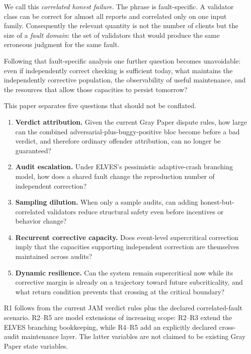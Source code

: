 We call this \emph{correlated honest failure}. The phrase is fault-specific. A validator class can be correct for almost all reports and correlated only on one input family. Consequently the relevant quantity is not the number of clients but the size of a \emph{fault domain}: the set of validators that would produce the same erroneous judgment for the same fault.

Following that fault-specific analysis one further question becomes unavoidable: even if independently correct checking is sufficient today, what maintains the independently corrective population, the observability of useful maintenance, and the resources that allow those capacities to persist tomorrow?

This paper separates five questions that should not be conflated.

\begin{enumerate}[label=\textbf{R\arabic*.},leftmargin=*]
\item \textbf{Verdict attribution.} Given the current Gray Paper dispute rules, how large can the combined adversarial-plus-buggy-positive bloc become before a bad verdict, and therefore ordinary offender attribution, can no longer be guaranteed?
\item \textbf{Audit escalation.} Under ELVES's pessimistic adaptive-crash branching model, how does a shared fault change the reproduction number of independent correction?
\item \textbf{Sampling dilution.} When only a sample audits, can adding honest-but-correlated validators reduce structural safety even before incentives or behavior change?
\item \textbf{Recurrent corrective capacity.} Does event-level supercritical correction imply that the capacities supporting independent correction are themselves maintained across audits?
\item \textbf{Dynamic resilience.} Can the system remain supercritical now while its corrective margin is already on a trajectory toward future subcriticality, and what return condition prevents that crossing at the critical boundary?
\end{enumerate}

R1 follows from the current JAM verdict rules plus the declared correlated-fault scenario. R2--R5 are model extensions of increasing scope: R2--R3 extend the ELVES branching bookkeeping, while R4--R5 add an explicitly declared cross-audit maintenance layer. The latter variables are not claimed to be existing Gray Paper state variables.

